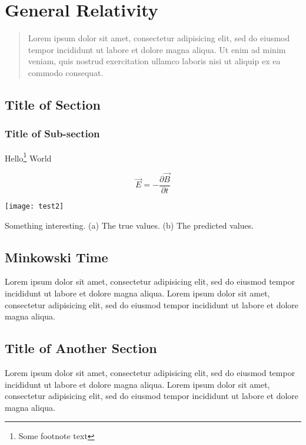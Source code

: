 \chapter{General Relativity}\margintoc
\begin{quote}
  Lorem ipsum dolor sit amet, consectetur adipisicing elit, sed do eiusmod tempor incididunt ut labore et dolore magna aliqua. Ut enim ad minim veniam, quis nostrud exercitation ullamco laboris nisi ut aliquip ex ea commodo consequat.
\end{quote}

\section{Title of Section}
\subsection{Title of Sub-section}

\lipsum[1]
Hello\footnote{Some footnote text} World
\lipsum[3-6]

\begin{equation}
\vec{E}=-\frac{\partial \vec{B}}{\partial t}
\end{equation}

\begin{marginfigure}
  \centering
  \texttt{[image: test2]}
  \caption{Something interesting. (a) The true values. (b) The predicted values.}
\end{marginfigure}
\section{Minkowski Time}
\lipsum[22-23]


\lipsum[11-13]
\begin{aside}
  Lorem ipsum dolor sit amet, consectetur adipisicing elit, sed do eiusmod tempor incididunt ut labore et dolore magna aliqua. Lorem ipsum dolor sit amet, consectetur adipisicing elit, sed do eiusmod tempor incididunt ut labore et dolore magna aliqua.
\end{aside}

\section{Title of Another Section}
\lipsum[1]
\begin{aside}[Remark:]
  Lorem ipsum dolor sit amet, consectetur adipisicing elit, sed do eiusmod tempor incididunt ut labore et dolore magna aliqua. Lorem ipsum dolor sit amet, consectetur adipisicing elit, sed do eiusmod tempor incididunt ut labore et dolore magna aliqua.
\end{aside}

